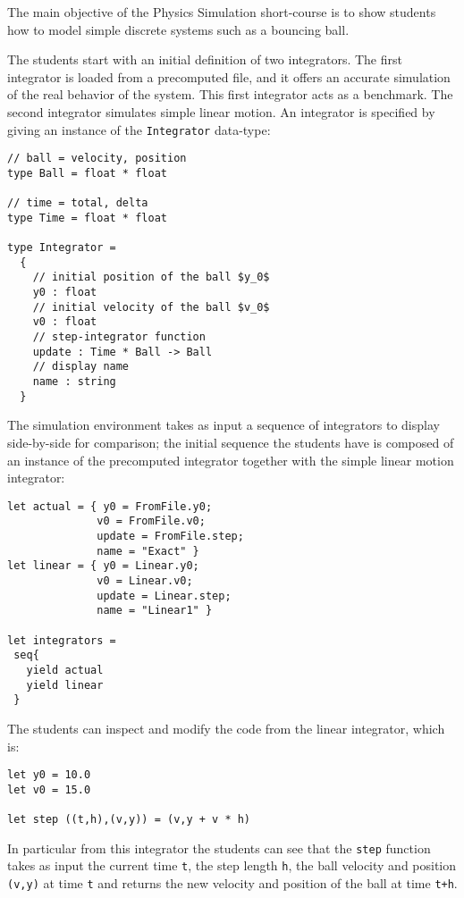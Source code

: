
The main objective of the Physics Simulation short-course is to show students how to model simple discrete systems such as a bouncing ball.

The students start with an initial definition of two integrators. The first integrator is loaded from a precomputed file, and it offers an accurate simulation of the real behavior of the system. This first integrator acts as a benchmark. The second integrator simulates simple linear motion. An integrator is specified by giving an instance of the \texttt{Integrator} data-type:

\begin{lstlisting}
// ball = velocity, position
type Ball = float * float

// time = total, delta
type Time = float * float

type Integrator = 
  { 
    // initial position of the ball $y_0$
    y0 : float
    // initial velocity of the ball $v_0$
    v0 : float
    // step-integrator function
    update : Time * Ball -> Ball
    // display name
    name : string 
  }
\end{lstlisting}


The simulation environment takes as input a sequence of integrators to display side-by-side for comparison; the initial sequence the students have is composed of an instance of the precomputed integrator together with the simple linear motion integrator:

\begin{lstlisting}
let actual = { y0 = FromFile.y0; 
              v0 = FromFile.v0; 
              update = FromFile.step; 
              name = "Exact" }
let linear = { y0 = Linear.y0; 
              v0 = Linear.v0; 
              update = Linear.step; 
              name = "Linear1" }

let integrators = 
 seq{
   yield actual
   yield linear
 }
\end{lstlisting}

The students can inspect and modify the code from the linear integrator, which is:

\begin{lstlisting}
let y0 = 10.0
let v0 = 15.0

let step ((t,h),(v,y)) = (v,y + v * h)
\end{lstlisting}

In particular from this integrator the students can see that the \texttt{step} function takes as input the current time \texttt{t}, the step length \texttt{h}, the ball velocity and position \texttt{(v,y)} at time \texttt{t} and returns the new velocity and position of the ball at time \texttt{t+h}.

